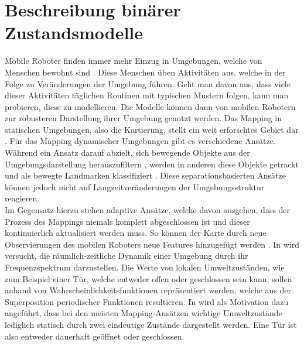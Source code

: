 \section{Beschreibung binärer Zustandsmodelle}
\label{sec.Beschreibung binärer Zustandsmodelle}
Mobile Roboter finden immer mehr Einzug in Umgebungen, welche von Menschen bewohnt sind \cite{Krajnik.2017}. Diese Menschen üben Aktivitäten aus, welche in der Folge zu Veränderungen der Umgebung führen. Geht man davon aus, dass viele dieser Aktivitäten täglichen Routinen mit typischen Mustern folgen, kann man probieren, diese zu modellieren. Die Modelle können dann von mobilen Robotern zur robusteren Darstellung ihrer Umgebung genutzt werden. Das Mapping in statischen Umgebungen, also die Kartierung, stellt ein weit erforschtes Gebiet dar \cite{Lakemeyer.2003}.
Für das Mapping dynamischer Umgebungen gibt es verschiedene Ansätze. Während ein Ansatz darauf abzielt, sich bewegende Objekte aus der Umgebungsdarstellung herauszufiltern \cite{Hahnel.2002}, werden in anderen diese Objekte getrackt und als bewegte Landmarken klassifiziert \cite{Montesano.2008}. Diese separationsbasierten Ansätze können jedoch nicht auf Langzeitveränderungen der Umgebungsstruktur reagieren. \\
Im Gegensatz hierzu stehen adaptive Ansätze, welche davon ausgehen, dass der Prozess des Mappings niemals komplett abgeschlossen ist und dieser kontinuierlich aktualisiert werden muss. So können der Karte durch neue Observierungen des mobilen Roboters neue Features hinzugefügt werden 
\cite{Milford.2010}. In \cite{Krajnik.2014} wird versucht, die räumlich-zeitliche Dynamik einer Umgebung durch ihr Frequenzspektrum darzustellen. Die Werte von lokalen Umweltzuständen, wie zum Beispiel einer Tür, welche entweder offen oder geschlossen sein kann, sollen anhand von Wahrscheinlichkeitsfunktionen repräsentiert werden, welche aus der Superposition periodischer Funktionen resultieren. In \cite{Krajnik.2014} wird als Motivation dazu angeführt, dass bei den meisten Mapping-Ansätzen wichtige Umweltzustände lediglich statisch durch zwei eindeutige Zustände dargestellt werden. Eine Tür ist also entweder dauerhaft geöffnet oder geschlossen.
